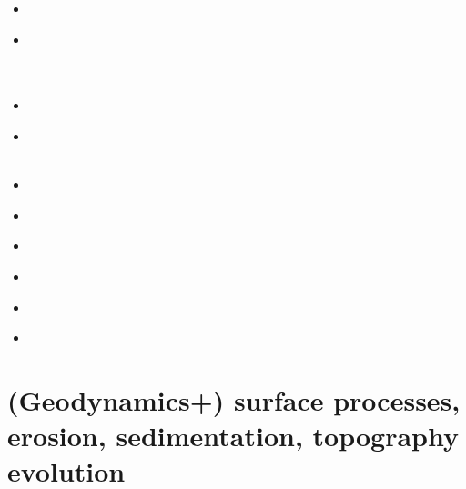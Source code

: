 \begin{small}
\begin{itemize}
\\
\item[\twothousandthirteen] 
\item[\twothousandfourteen] 
\\
\\
\\
\item[\twothousandfifteen] 
\item[\twothousandsixteen] 
\\
\\
\item[\twothousandseventeen] 
\item[\twothousandeighteen] 
 \\
\item[\twothousandnineteen] 
 \\
\item[\twothousandtwenty] 
 \\
\item[\twothousandtwentytwo] 
\item[\twothousandtwentythree] 
 \\ 
\end{itemize}
\end{small}

\section{(Geodynamics+) surface processes, erosion, sedimentation, topography evolution}

